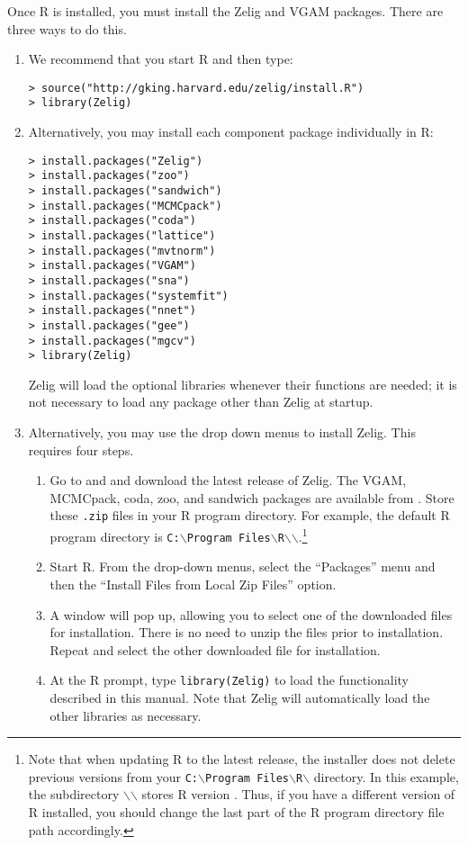 \documentclass{article}
\begin{document}
Once R is installed, you must install the Zelig and VGAM packages.  There
are three ways to do this.  
\begin{enumerate}
\item We recommend that you start R and then type:
\begin{verbatim}
> source("http://gking.harvard.edu/zelig/install.R")
> library(Zelig)
\end{verbatim}
\item Alternatively, you may install each component package individually 
in R:
\begin{verbatim}
> install.packages("Zelig")
> install.packages("zoo")
> install.packages("sandwich")
> install.packages("MCMCpack")
> install.packages("coda")
> install.packages("lattice")
> install.packages("mvtnorm")
> install.packages("VGAM")
> install.packages("sna")
> install.packages("systemfit")
> install.packages("nnet")
> install.packages("gee")
> install.packages("mgcv")
> library(Zelig)
\end{verbatim}
Zelig will load the optional libraries whenever their functions are
needed; it is not necessary to load any package other than Zelig at startup.  

\item \label{manual.windows}Alternatively, you may use the drop down
  menus to install Zelig.  This requires four steps.
\begin{enumerate}
\item \label{win.zelig} Go to  and
  and download the latest release of Zelig.  The VGAM, MCMCpack,
coda, zoo, and sandwich packages are available from
.  Store these
  \texttt{.zip} files in your R program directory.  For example, the
  default R program directory is {\tt C:$\backslash$Program
  Files$\backslash$R$\backslash$\rwvers$\backslash$}.\footnote{Note
  that when updating R to the latest release, the installer does not
  delete previous versions from your {\tt C:$\backslash$Program
  Files$\backslash$R$\backslash$} directory.  In this example, the
  subdirectory {\tt $\backslash$\rwvers$\backslash$} stores R version
  \fullrvers.  Thus, if you have a different version of R installed,
  you should change the last part of the R program directory file path
  accordingly.}
\item Start R.  From the drop-down menus, select the ``Packages'' menu
  and then the ``Install Files from Local Zip Files'' option.
\item A window will pop up, allowing you to select one of the
  downloaded files for installation.  There is no need to unzip the
  files prior to installation.  Repeat and select the other downloaded
  file for installation.
\item At the R prompt, type \texttt{library(Zelig)} to load the
  functionality described in this manual.  Note that Zelig will
  automatically load the other libraries as necessary.
\end{enumerate}


\end{enumerate}
\end{document}
